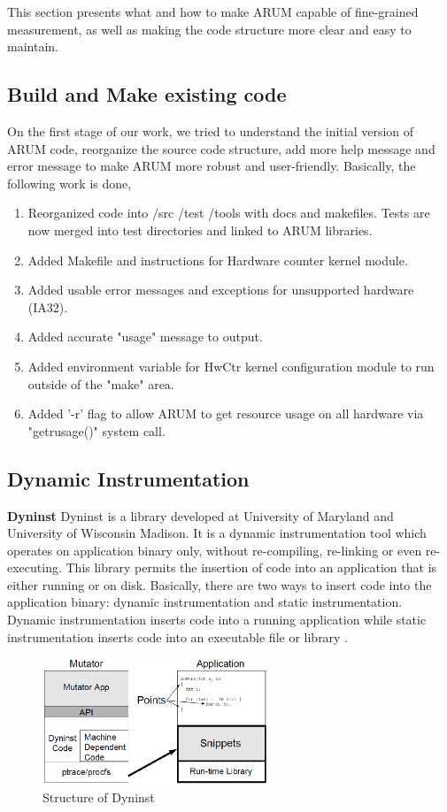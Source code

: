 \documentclass[11pt,letterpaper,oneside]{article}
\begin{document}
This section presents what and how to make ARUM capable of fine-grained measurement, as well as making the code structure more clear and easy to maintain.

\subsection{Build and Make existing code}
On the first stage of our work, we tried to understand the initial version of ARUM code, reorganize the source code structure, add more help message and error message to make ARUM more robust and user-friendly. Basically, the following work is done,
\begin{enumerate}
\item Reorganized code into /src /test /tools with docs and makefiles.  Tests are now merged into test directories and linked to ARUM libraries.
\item Added Makefile and instructions for Hardware counter kernel module.
\item Added usable error messages and exceptions for unsupported hardware (IA32).
\item Added accurate "usage" message to output.
\item Added environment variable for HwCtr kernel configuration module to run outside of the "make" area.
\item Added '-r' flag to allow ARUM to get resource usage on all hardware via "getrusage()" system call.
\end{enumerate}

\subsection{Dynamic Instrumentation}
\textbf{Dyninst}\newline
\indent Dyninst is a library developed at University of Maryland and University of Wisconsin Madison. It is a dynamic instrumentation tool which operates on application binary only, without re-compiling, re-linking or even re-executing. This library permits the insertion of code into an application that is either running or on disk. Basically, there are two ways to insert code into the application binary:  dynamic instrumentation and static instrumentation. Dynamic instrumentation inserts code into a running application while static instrumentation inserts code into an executable file or library \cite{bib:dyninstmanual}.

\begin{figure}
\begin{center}
\includegraphics[width=0.6\textwidth]{dyninst.eps}
\caption{Structure of Dyninst}
\label{fig:dyninst}
\end{center}
\end{figure}
\end{document}
